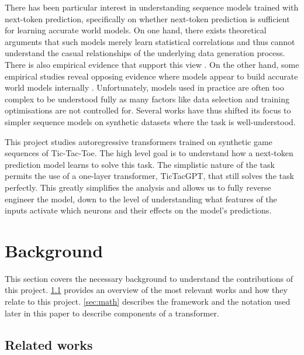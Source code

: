 \documentclass{article}
\newcommand{\ttgpt}{TicTacGPT\xspace}
\newcommand{\ttt}{Tic-Tac-Toe\xspace}
\begin{document}
There has been particular interest in understanding sequence models trained with next-token prediction, specifically on whether next-token prediction is sufficient for learning accurate world models. On one hand, there exists theoretical arguments \citep{bender2020climbing,merrill2021provable} that such models merely learn statistical correlations and thus cannot understand the casual relationships of the underlying data generation process. There is also empirical evidence that support this view \cite{mccoy2023embers}. On the other hand, some empirical studies reveal opposing evidence where models appear to build accurate world models internally \cite{meng2022locating,tigges2023linear}. Unfortunately, models used in practice are often too complex to be understood fully as many factors like data selection and training optimisations are not controlled for. Several works have thus shifted its focus to simpler sequence models on synthetic datasets \citep{toshniwal2021learning,orthello-gpt} where the task is well-understood.

This project studies autoregressive transformers trained on synthetic game sequences of \ttt. The high level goal is to understand how a next-token prediction model learns to solve this task. The simplistic nature of the task permits the use of a one-layer transformer, \ttgpt, that still solves the task perfectly. This greatly simplifies the analysis and allows us to fully reverse engineer the model, down to the level of understanding what features of the inputs activate which neurons and their effects on the model's predictions.

\section{Background}

This section covers the necessary background to understand the contributions of this project. \cref{sec:related} provides an overview of the most relevant works and how they relate to this project. \cref{sec:math} describes the framework and the notation used later in this paper to describe components of a transformer.

\subsection{Related works} \label{sec:related}
\end{document}
